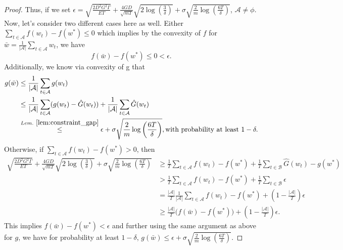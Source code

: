 \documentclass{article} %
\def\A{{\mathcal A}}
\def\B{{\mathcal B}}
\begin{document}
\begin{proof}
    Thus, if we set $\epsilon = \sqrt{\frac{{2 D^2 G^2 \Gamma}}{{E T}}}
    + \frac{4GD}{\sqrt{mT}}\sqrt{2\log\left(\frac{3}{\delta}\right)}
    +  \sigma\sqrt{\frac{2}{m} \log\left(\frac{6T}{\delta}\right)}$, $\A \neq \phi$.
    Now, let's consider two different cases here as well. Either $\sum_{t\in \A} f(w_t)-f(w^*) \leq 0$ which implies by the convexity of $f$ for $\bar{w} = \frac{1}{|\A|} \sum_{t\in \A} w_t$, we have
    \begin{equation}
    \label{eq:fedhsgm_partial_objective_result1_1}
        f(\bar{w})-f(w^*) \leq 0 <\epsilon.
    \end{equation}
    Additionally, we know via convexity of g that
    \begin{align*}
        g(\bar{w}) &\leq \frac{1}{|\A|} \sum_{t\in \A}g(w_t)
        \\
        & \leq \frac{1}{|\A|} \sum_{t\in \A}(g(w_t) - \hat{G}(w_t)) + \frac{1}{|\A|} \sum_{t\in \A}\hat{G}(w_t)
        \\
        &\overset{Lem.~\ref{lem:constraint_gap}}{\leq} \epsilon + \sigma \sqrt{\frac{2}{m} \log\left(\frac{6T}{\delta}\right)}, \text{with probability at least } 1-\delta.
    \end{align*}
    Otherwise, if $\sum_{t\in \A} f(w_t)-f(w^*) >0$, then
    \begin{equation}\label{eq:fedhsgm_partial}
        \begin{aligned}
          \sqrt{\frac{{2 D^2 G^2 \Gamma}}{{E T}}}
            + \frac{4GD}{\sqrt{mT}}\sqrt{2\log\left(\frac{3}{\delta}\right)}
            +  \sigma\sqrt{\frac{2}{m} \log\left(\frac{6T}{\delta}\right)}  &\geq \frac{1}{T} \sum_{t\in \A} f(w_t)-f(w^*) +\frac{1}{T} \sum_{t\in \B} \hat{G}(w_t)-g(w^*)\\&>\frac{1}{T} \sum_{t\in \A} f(w_t)-f(w^*) +\frac{1}{T} \sum_{t\in \B} \epsilon\\&=\frac{|\A|}{T}  \frac{1}{|\A|}\sum_{t\in \A} f(w_t)-f(w^*) +(1-\frac{|\A|}{T}) \epsilon\\&\geq\frac{|\A|}{T} \big( f(\bar{w})-f(w^*) \big)+(1-\frac{|\A|}{T}) \epsilon .
        \end{aligned}
    \end{equation}
    This implies $f(\bar{w})-f(w^*)<\epsilon$ and further using the same argument as above for $g$, we have for probability at least $1-\delta$, $g(\bar{w}) \leq \epsilon + \sigma\sqrt{\frac{2}{m}\log\left(\frac{6T}{\delta}\right)}.$
\end{proof}
\end{document}
